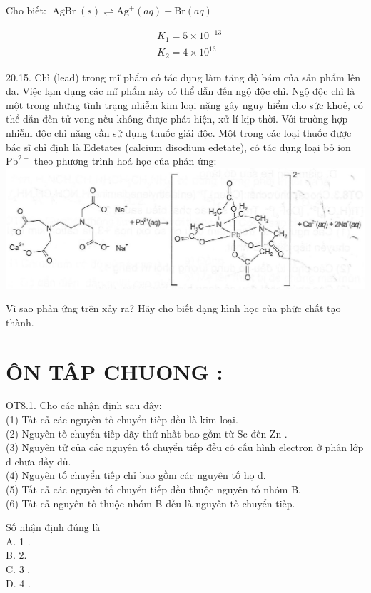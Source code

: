 \documentclass[10pt]{article}
\begin{document}
Cho biết: $\operatorname{AgBr}(s) \rightleftharpoons \mathrm{Ag}^{+}(a q)+\mathrm{Br}(a q)$

$$
\begin{aligned}
& K_{1}=5 \times 10^{-13} \\
& K_{2}=4 \times 10^{13}
\end{aligned}
$$

20.15. Chì (lead) trong mĩ phẩm có tác dụng làm tăng độ bám của sản phẩm lên da. Việc lạm dụng các mĩ phẩm này có thể dẫn đến ngộ độc chì. Ngộ độc chì là một trong những tình trạng nhiễm kim loại nặng gây nguy hiểm cho sức khoẻ, có thể dẫn đến tử vong nếu không được phát hiện, xử lí kịp thời. Với trường hợp nhiễm độc chì nặng cần sử dụng thuốc giải độc. Một trong các loại thuốc được bác sĩ chỉ định là Edetates (calcium disodium edetate), có tác dụng loại bỏ ion $\mathrm{Pb}^{2+}$ theo phương trình hoá học của phản ứng:\\
\includegraphics[max width=\textwidth, center]{2025_10_23_de6f5713836e4e91b3c8g-129}

Vì sao phản ứng trên xảy ra? Hãy cho biết dạng hình học của phức chất tạo thành.

\section*{ÔN TÂP CHUONG :}
OT8.1. Cho các nhận định sau đây:\\
(1) Tất cả các nguyên tố chuyển tiếp đều là kim loại.\\
(2) Nguyên tố chuyển tiếp dãy thứ nhất bao gồm từ Sc đến Zn .\\
(3) Nguyên tử của các nguyên tố chuyển tiếp đều có cấu hình electron ở phân lớp d chưa đầy đủ.\\
(4) Nguyên tố chuyển tiếp chỉ bao gồm các nguyên tố họ d.\\
(5) Tất cả các nguyên tố chuyển tiếp đều thuộc nguyên tố nhóm B.\\
(6) Tất cả nguyên tố thuộc nhóm B đều là nguyên tố chuyển tiếp.

Số nhận định đúng là\\
A. 1 .\\
B. 2.\\
C. 3 .\\
D. 4 .
\end{document}
